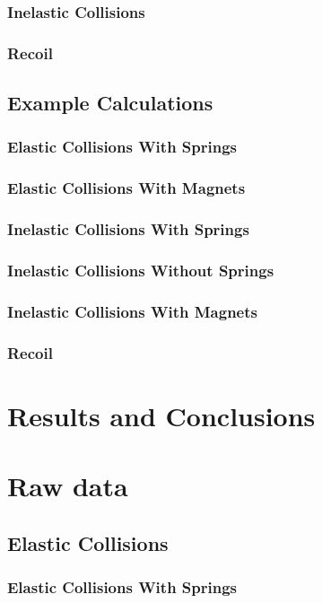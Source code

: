 \documentclass[12pt]{article}
\begin{document}
\subsubsection{Inelastic Collisions}
\subsubsection{Recoil}

\subsection{Example Calculations}
\subsubsection{Elastic Collisions With Springs}
\subsubsection{Elastic Collisions With Magnets}
\subsubsection{Inelastic Collisions With Springs}
\subsubsection{Inelastic Collisions Without Springs}
\subsubsection{Inelastic Collisions With Magnets}
\subsubsection{Recoil}

\newpage
\section{Results and Conclusions}

\newpage
\appendix
\section{Raw data}
\subsection{Elastic Collisions}
\subsubsection{Elastic Collisions With Springs}
\end{document}
